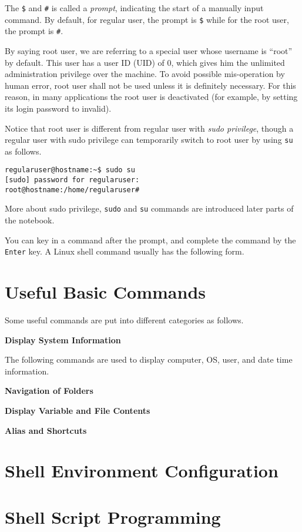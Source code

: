 The \verb|$| and \verb|#| is called a \textit{prompt}, indicating the start of a manually input command. By default, for regular user, the prompt is \verb|$| while for the root user, the prompt is \verb|#|.

By saying root user, we are referring to a special user whose username is ``root'' by default. This user has a user ID (UID) of $0$, which gives him the unlimited administration privilege over the machine. To avoid possible mis-operation by human error, root user shall not be used unless it is definitely necessary. For this reason, in many applications the root user is deactivated (for example, by setting its login password to invalid).

Notice that root user is different from regular user with \textit{sudo privilege}, though a regular user with sudo privilege can temporarily switch to root user by using \verb|su| as follows.
\begin{verbatim}
regularuser@hostname:~$ sudo su
[sudo] password for regularuser:
root@hostname:/home/regularuser#
\end{verbatim}

More about sudo privilege, \verb|sudo| and \verb|su| commands are introduced later parts of the notebook.

You can key in a command after the prompt, and complete the command by the \verb|Enter| key. A Linux shell command usually has the following form.

\section{Useful Basic Commands}

Some useful commands are put into different categories as follows.

\vspace{0.1in}
\noindent \textbf{Display System Information}
\vspace{0.1in}

The following commands are used to display computer, OS, user, and date time information.



\vspace{0.1in}
\noindent \textbf{Navigation of Folders}
\vspace{0.1in}

 



\vspace{0.1in}
\noindent \textbf{Display Variable and File Contents}
\vspace{0.1in}



\vspace{0.1in}
\noindent \textbf{Alias and Shortcuts}
\vspace{0.1in}

\section{Shell Environment Configuration}


\section{Shell Script Programming}













